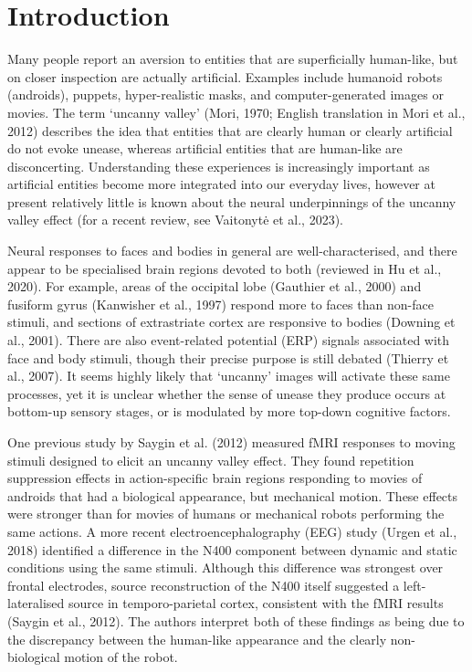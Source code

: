 \documentclass[
]{article}
\begin{document}
\hypertarget{introduction}{%
\section{Introduction}\label{introduction}}

Many people report an aversion to entities that are superficially human-like, but on closer inspection are actually artificial. Examples include humanoid robots (androids), puppets, hyper-realistic masks, and computer-generated images or movies. The term `uncanny valley' (Mori, 1970; English translation in Mori et al., 2012) describes the idea that entities that are clearly human or clearly artificial do not evoke unease, whereas artificial entities that are human-like are disconcerting. Understanding these experiences is increasingly important as artificial entities become more integrated into our everyday lives, however at present relatively little is known about the neural underpinnings of the uncanny valley effect (for a recent review, see Vaitonytė et al., 2023).

Neural responses to faces and bodies in general are well-characterised, and there appear to be specialised brain regions devoted to both (reviewed in Hu et al., 2020). For example, areas of the occipital lobe (Gauthier et al., 2000) and fusiform gyrus (Kanwisher et al., 1997) respond more to faces than non-face stimuli, and sections of extrastriate cortex are responsive to bodies (Downing et al., 2001). There are also event-related potential (ERP) signals associated with face and body stimuli, though their precise purpose is still debated (Thierry et al., 2007). It seems highly likely that `uncanny' images will activate these same processes, yet it is unclear whether the sense of unease they produce occurs at bottom-up sensory stages, or is modulated by more top-down cognitive factors.

One previous study by Saygin et al. (2012) measured fMRI responses to moving stimuli designed to elicit an uncanny valley effect. They found repetition suppression effects in action-specific brain regions responding to movies of androids that had a biological appearance, but mechanical motion. These effects were stronger than for movies of humans or mechanical robots performing the same actions. A more recent electroencephalography (EEG) study (Urgen et al., 2018) identified a difference in the N400 component between dynamic and static conditions using the same stimuli. Although this difference was strongest over frontal electrodes, source reconstruction of the N400 itself suggested a left-lateralised source in temporo-parietal cortex, consistent with the fMRI results (Saygin et al., 2012). The authors interpret both of these findings as being due to the discrepancy between the human-like appearance and the clearly non-biological motion of the robot.
\end{document}
